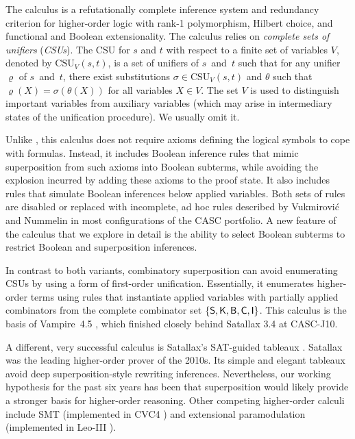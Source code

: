 \documentclass[smallcondensed,draft]{svjour3}     %
\begin{document}
The \osup{} calculus \cite{bbtv-21-full-ho-sup} is a refutationally
complete inference system and redundancy criterion for higher-order logic with
rank-1 polymorphism, Hilbert choice, and functional and Boolean extensionality.
The calculus relies on
\emph{complete sets of unifiers}
(\emph{CSUs}). The CSU for $s$ and $t$ with respect to a finite set of variables
$V$, denoted by $\mathrm{CSU}_V(s,t)$, is a set of unifiers of $s$~and~$t$ such
that for any unifier $\varrho$ of $s$~and~$t$, there exist substitutions $\sigma
\in \mathrm{CSU}_V(s,t)$ and $\theta$ such that $\varrho(X) = \sigma(\theta(X))$
for all variables $X \in V$. The set $V$ is used to distinguish
important variables from auxiliary variables (which may arise in intermediary
states of the unification procedure). We usually omit it.

Unlike \lsup, this calculus 
does not require axioms defining the logical symbols to cope with formulas.
Instead, it includes Boolean inference rules that mimic
superposition from such axioms into Boolean subterms,
while avoiding the explosion incurred by adding these axioms to the proof state. It
also includes rules that simulate Boolean inferences below applied variables.
Both sets of rules are disabled or replaced with incomplete, ad hoc rules
described by Vukmirović and Nummelin \cite{our-bool-paper} in most configurations
of the CASC portfolio.
A new feature of the calculus that we explore in detail is
the ability to select Boolean subterms
to restrict Boolean and superposition inferences.

In contrast to both \lsup{} variants, combinatory superposition can
avoid enumerating CSUs by
using a form of first-order unification.
Essentially, it enumerates higher-order terms
using rules that instantiate applied variables with partially applied
combinators from the complete combinator set $\{\mathsf{S}, \mathsf{K}, \mathsf{B},
\mathsf{C}, \mathsf{I}\}$. This calculus is the basis of Vampire~4.5
\cite{br-20-full-sup-w-combs}, which finished
closely behind Satallax 3.4 %
at CASC-J10.

A different, very successful calculus is Satallax's SAT-guided tableaux
\cite{backes-brown-2011}. Satallax was the leading higher-order prover of the
2010s. Its simple and elegant tableaux avoid deep superposition-style rewriting
inferences.
Nevertheless, our working hypothesis for the past six years has been
that superposition would likely provide a stronger basis for higher-order
reasoning.
Other competing higher-order calculi include SMT (implemented in CVC4
\cite{brotb-19-ho-smt, cbetal-11-cvc4}) and extensional paramodulation (implemented in Leo-III \cite{sb-21-leo3}).
\end{document}
